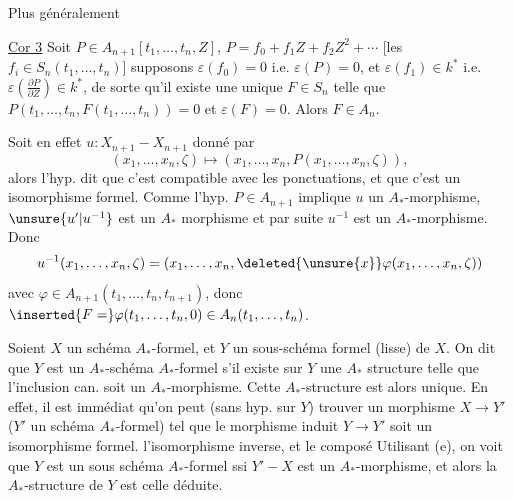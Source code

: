 Plus généralement

\uline{Cor 3} Soit $P\in A_{n+1}[t_1,\ldots,t_n,Z]$, $P=f_0+f_1Z+f_2Z^2+\cdots$ [les $f_i\in S_n(t_1,\ldots,t_n)$] supposons $\varepsilon(f_0)=0$ i.e. $\varepsilon(P)=0$, et $\varepsilon(f_1)\in k^*$ i.e. $\varepsilon\left(\frac{\partial P}{\partial Z}\right)\in k^*$, de sorte qu'il existe une unique $F\in S_n$ telle que $P(t_1,\ldots,t_n,F(t_1,\ldots,t_n))=0$ et $\varepsilon(F)=0$. Alors $F\in A_n$.

Soit en effet $u:X_{n+1}\mathbin{-}X_{n+1}$ donné par
\[
(x_1,\ldots,x_n,\zeta)\longmapsto(x_1,\ldots,x_n,P(x_1,\ldots,x_n,\zeta)),
\]
alors l'hyp. dit que c'est compatible avec les ponctuations, et que c'est un isomorphisme formel. Comme l'hyp. $P\in A_{n+1}$ implique $u$ un $A_*$-morphisme, $\unsure{u'|u^{-1}}$ est un $A_*$ morphisme et par suite $u^{-1}$ est un $A_*$-morphisme. Donc
\[
u^{-1}(x_1,\ldots,x_n,\zeta)=(x_1,\ldots,x_n,\deleted{\unsure{x}}\varphi(x_1,\ldots,x_n,\zeta))
\]
avec $\varphi\in A_{n+1}(t_1,\ldots,t_n,t_{n+1})$, donc $\inserted{F=}\varphi(t_1,\ldots,t_n,0)\in A_n(t_1,\ldots,t_n)$.


Soient $X$ un schéma $A_*$-formel, et $Y$ un sous-schéma formel (lisse) de $X$.  On dit que $Y$ est un  $A_*$-schéma $A_*$-formel s'il existe sur $Y$ une $A_*$ structure telle que l'inclusion can. soit un $A_*$-morphisme. Cette $A_*$-structure est alors unique. En effet, il est immédiat qu'on peut (sans hyp. sur $Y$) trouver un  morphisme $X\to Y'$ ($Y'$ un schéma $A_*$-formel) tel que le morphisme induit $Y\to Y'$ soit un isomorphisme formel.  l'isomorphisme inverse, et le composé
Utilisant (e), on  voit que  $Y$ est un sous schéma $A_*$-formel ssi $Y'\mathbin{-}X$ est un $A_*$-morphisme, et alors la $A_*$-structure de $Y$ est celle déduite.

